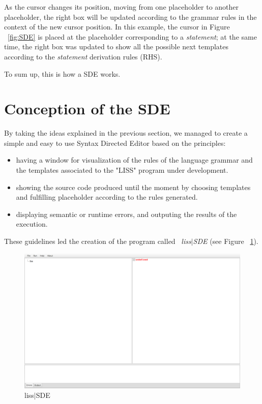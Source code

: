 \documentclass[
  oneside,
  11pt, a4paper,
  footinclude=true,
  headinclude=true,
  cleardoublepage=empty
]{scrbook}
\begin{document}
As the cursor changes its position, moving from one placeholder to another placeholder, the right box will be updated according to the grammar rules in the context of the new cursor position.
In this example, the cursor in Figure ~\ref{fig:SDE} is placed at the placeholder corresponding to a \textit{statement}; at the same time, the right box was updated to show all the possible next templates according to the \textit{statement} derivation rules (RHS).

To sum up, this is how a SDE works.

\section{Conception of the SDE}

By taking the ideas explained in the previous section, we managed to create a simple and easy to use Syntax Directed Editor based on the principles:

\begin{itemize}
\item having a window for visualization of the rules of the language grammar and the templates associated to the "LISS" program under development.
\item showing the source code produced until the moment by choosing templates and fulfilling placeholder according to the rules generated.
\item displaying semantic or runtime errors, and outputing the results of the execution.
\end{itemize}

These guidelines led the creation of the program called ~\textit{liss$|$SDE} (see Figure ~\ref{fig:LISS-SDE}).

\begin{figure}[h!]
  \centering
    \includegraphics[width=1\textwidth]{img/LISS-SDE.png}
    \caption{liss$|$SDE}
    \label{fig:LISS-SDE}
\end{figure}
\end{document}
